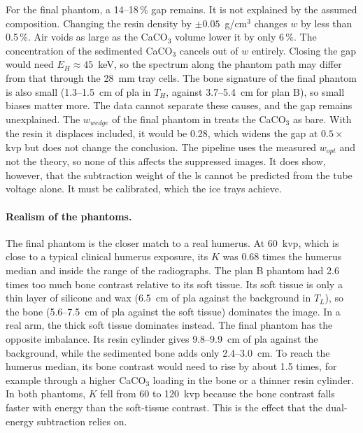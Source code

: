 For the final phantom, a 14--18\,\% gap remains. It is not explained by the assumed composition. Changing the resin density by $\pm 0.05$~g/cm$^3$ changes $w$ by less than 0.5\,\%. Air voids as large as the CaCO$_3$ volume lower it by only 6\,\%. The concentration of the sedimented CaCO$_3$ cancels out of $w$ entirely. Closing the gap would need $E_H \approx 45$~keV, so the spectrum along the phantom path may differ from that through the 28~mm tray cells. The bone signature of the final phantom is also small (1.3--1.5~cm of \gls{pla} in $T_H$, against 3.7--5.4~cm for plan B), so small biases matter more. The data cannot separate these causes, and the gap remains unexplained. The $w_{wedge}$ of the final phantom in  treats the CaCO$_3$ as bare. With the resin it displaces included, it would be 0.28, which widens the gap at $0.5\times$\gls{kvp} but does not change the conclusion. The pipeline uses the measured $w_{opt}$ and not the theory, so none of this affects the suppressed images. It does show, however, that the subtraction weight of the \gls{ls} cannot be predicted from the tube voltage alone. It must be calibrated, which the ice trays achieve.

\paragraph{Realism of the phantoms.} The final phantom is the closer match to a real humerus. At 60~\gls{kvp}, which is close to a typical clinical humerus exposure, its $K$ was 0.68 times the humerus median and inside the range of the radiographs. The plan B phantom had 2.6 times too much bone contrast relative to its soft tissue. Its soft tissue is only a thin layer of silicone and wax (6.5~cm of \gls{pla} against the background in $T_L$), so the bone (5.6--7.5~cm of \gls{pla} against the soft tissue) dominates the image. In a real arm, the thick soft tissue dominates instead. The final phantom has the opposite imbalance. Its resin cylinder gives 9.8--9.9~cm of \gls{pla} against the background, while the sedimented bone adds only 2.4--3.0~cm. To reach the humerus median, its bone contrast would need to rise by about 1.5 times, for example through a higher CaCO$_3$ loading in the bone or a thinner resin cylinder. In both phantoms, $K$ fell from 60 to 120~\gls{kvp} because the bone contrast falls faster with energy than the soft-tissue contrast. This is the effect that the dual-energy subtraction relies on.

